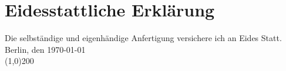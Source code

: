 
\chapter*{Eidesstattliche Erkl\"{a}rung}
\thispagestyle{empty}
\vfill
Die selbst\"{a}ndige und eigenh\"{a}ndige Anfertigung versichere ich an Eides Statt.
\vspace{10pt}\\
Berlin, den \today{}
\vspace{10pt}\\
\line(1,0){200}
\clearpage




